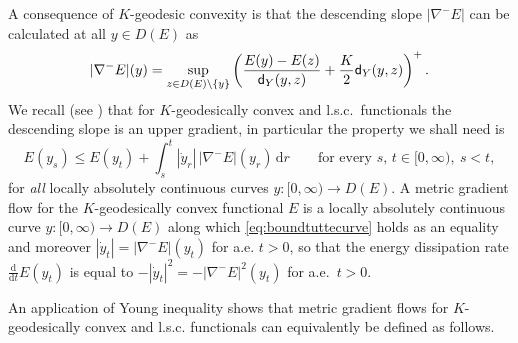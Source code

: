 \documentclass[reqno,11pt]{article}
\numberwithin{equation}{section}
\newcommand{\sfd}{{\sf d}}
\renewcommand{\d}{{\mathrm d}}
\newcommand{\dt}{{\d t}}
\begin{document}
A consequence of $K$-geodesic convexity is that the descending slope
$|\nabla^- E|$ can be calculated at all $y\in D(E)$ as
\begin{equation}
\label{eq:slopesup} |\nabla^-E|(y)=\sup_{z\in
D(E)\setminus\{y\}}\left(\frac{E(y)-E(z)}{\sfd_Y (y,z)}+\frac K2
\sfd_Y(y,z)\right)^+.
\end{equation}
We recall (see \cite[Corollary~2.4.10]{Ambrosio-Gigli-Savare08})
that for $K$-geodesically convex and l.s.c.~functionals
the descending slope is an upper gradient, in particular
the property we shall need is
\begin{equation}
\label{eq:boundtuttecurve} E(y_s)\le E(y_t)+\int_s^t |\dot
y_r|\,|\nabla^-E|(y_r)\,\d r \qquad\text{for every }s,\,t\in
[0,\infty),\ s<t,
\end{equation}
for \emph{all} locally absolutely continuous curves $y:[0,\infty)\to
D(E)$. A metric gradient flow for the $K$-geodesically convex
functional $E$ is a locally absolutely continuous curve
$y:[0,\infty)\to D(E)$ along which \eqref{eq:boundtuttecurve} holds
as an equality and moreover $|\dot y_t|=|\nabla^- E|(y_t)$ for a.e.
$t>0$, so that the energy dissipation rate $\tfrac{\d}{\dt}E(y_t)$
is equal to $-|\dot y_t|^2=-|\nabla^- E|^2(y_t)$ for a.e.~$t>0$.

An application of Young inequality shows that metric gradient flows
for $K$-geodesically convex and l.s.c. functionals can equivalently
be defined as follows.
\end{document}
